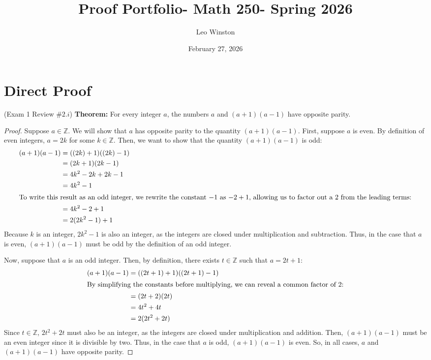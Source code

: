 \documentclass[12pt]{amsart}
\title{Proof Portfolio- Math 250- Spring 2026}
\author{Leo Winston}
\date{February 27, 2026}
\begin{document}
\maketitle
\section{Direct Proof}
{(Exam 1 Review $\#2.i$) }
\textbf{Theorem:}{ For every integer $a$, the numbers $a$ and $(a+1)(a-1)$ have opposite parity.}
\begin{proof}
Suppose $a \in \mathbb{Z}$. We will show that $a$ has opposite parity to the quantity $(a+1)(a-1)$. First, suppose $a$ is even. By definition of even integers, $a = 2k$ for some $k \in \mathbb{Z}$. Then, we want to show that the quantity $(a+1)(a-1)$ is odd:
\begin{align*}
(a+1)(a-1) &= ((2k)+1)((2k)-1) \\ 
&= (2k+1)(2k-1) \\ 
&= 4k^2-2k+2k-1 \\ 
&= 4k^2-1 \\ 
\intertext{To write this result as an odd integer, we rewrite the constant $-1$ as $-2+1$, allowing us to factor out a $2$ from the leading terms:} 
&= 4k^2-2+1 \\ 
&= 2(2k^2-1)+1
\end{align*}
Because $k$ is an integer, $2k^2 - 1$ is also an integer, as the integers are closed under multiplication and subtraction. Thus, in the case that $a$ is even, $(a+1)(a-1)$ must be odd by the definition of an odd integer.

Now, suppose that $a$ is an odd integer. Then, by definition, there exists $t \in \mathbb{Z}$ such that $a=2t+1$:
\begin{align*}
(a+1)(a-1) &= ((2t+1)+1)((2t+1)-1) \\ 
\intertext{By simplifying the constants before multiplying, we can reveal a common factor of $2$:} 
&= (2t+2)(2t) \\ 
&= 4t^2 + 4t \\ 
&= 2(2t^2+2t)
\end{align*}
Since $t \in \mathbb{Z}$, $2t^2+2t$ must also be an integer, as the integers are closed under multiplication and addition. Then, $(a+1)(a-1)$ must be an even integer since it is divisible by two. Thus, in the case that $a$ is odd, $(a+1)(a-1)$ is even. So, in all cases, $a$ and $(a+1)(a-1)$ have opposite parity.
\end{proof}
\newpage
\end{document}
